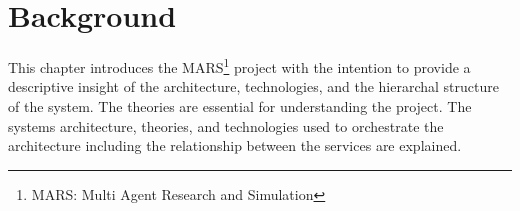 \newpage
\chapter{Background}
	
This chapter introduces the MARS\footnote{MARS: Multi Agent Research and Simulation} project with the intention to provide a descriptive insight
of the architecture, technologies, and the hierarchal structure of the system. The theories are essential for understanding the project. 
The systems architecture, theories, and technologies used to orchestrate the architecture including the 
relationship between the services are explained.

	
	
	